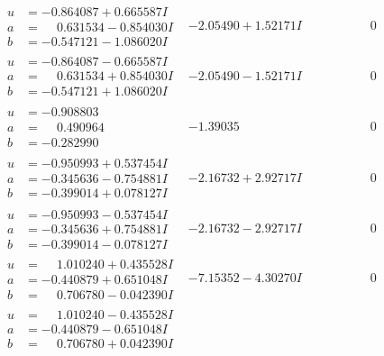 \documentclass[1p]{elsarticle_modified}
\theoremstyle{definition}
\begin{document}
$$\begin{array}{c|c|c}
 \hline 
\begin{aligned}
u &= -0.864087 + 0.665587 I \\
a &= \phantom{-}0.631534 - 0.854030 I \\
b &= -0.547121 - 1.086020 I\end{aligned}
 & -2.05490 + 1.52171 I & \phantom{-0.000000 } 0 \\ \hline\begin{aligned}
u &= -0.864087 - 0.665587 I \\
a &= \phantom{-}0.631534 + 0.854030 I \\
b &= -0.547121 + 1.086020 I\end{aligned}
 & -2.05490 - 1.52171 I & \phantom{-0.000000 } 0 \\ \hline\begin{aligned}
u &= -0.908803\phantom{ +0.000000I} \\
a &= \phantom{-}0.490964\phantom{ +0.000000I} \\
b &= -0.282990\phantom{ +0.000000I}\end{aligned}
 & -1.39035\phantom{ +0.000000I} & \phantom{-0.000000 } 0 \\ \hline\begin{aligned}
u &= -0.950993 + 0.537454 I \\
a &= -0.345636 - 0.754881 I \\
b &= -0.399014 + 0.078127 I\end{aligned}
 & -2.16732 + 2.92717 I & \phantom{-0.000000 } 0 \\ \hline\begin{aligned}
u &= -0.950993 - 0.537454 I \\
a &= -0.345636 + 0.754881 I \\
b &= -0.399014 - 0.078127 I\end{aligned}
 & -2.16732 - 2.92717 I & \phantom{-0.000000 } 0 \\ \hline\begin{aligned}
u &= \phantom{-}1.010240 + 0.435528 I \\
a &= -0.440879 + 0.651048 I \\
b &= \phantom{-}0.706780 - 0.042390 I\end{aligned}
 & -7.15352 - 4.30270 I & \phantom{-0.000000 } 0 \\ \hline\begin{aligned}
u &= \phantom{-}1.010240 - 0.435528 I \\
a &= -0.440879 - 0.651048 I \\
b &= \phantom{-}0.706780 + 0.042390 I\end{aligned}

\end{array}$$
\end{document}
